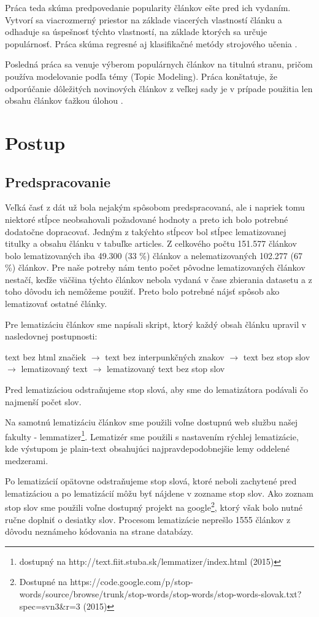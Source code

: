 \documentclass[runningheads,a4paper]{llncs}
\begin{document}
Práca teda skúma predpovedanie popularity článkov ešte pred ich vydaním. Vytvorí sa viacrozmerný priestor na základe viacerých vlastností článku a odhaduje sa úspešnosť týchto vlastností, na základe ktorých sa určuje populárnosť. Práca skúma regresné aj klasifikačné metódy strojového učenia \cite{pulse}.

Posledná práca sa venuje výberom populárnych článkov na titulnú stranu, pričom používa modelovanie podľa témy (Topic Modeling). Práca konštatuje, že odporúčanie dôležitých novinových článkov z veľkej sady je v prípade použitia len obsahu článkov ťažkou úlohou \cite{topic}.

\section{Postup}
\subsection{Predspracovanie}
Veľká časť z dát už bola nejakým spôsobom predspracovaná, ale i napriek tomu niektoré stĺpce neobsahovali požadované hodnoty a preto ich bolo potrebné dodatočne dopracovať. Jedným z takýchto stĺpcov bol stĺpec lematizovanej titulky a obsahu článku v tabuľke articles. Z celkového počtu 151.577 článkov bolo lematizovaných iba 49.300 (33 \%) článkov a nelematizovaných 102.277 (67 \%) článkov. Pre naše potreby nám tento počet pôvodne lematizovaných článkov nestačí, keďže väčšina týchto článkov nebola vydaná v čase zbierania datasetu a z toho dôvodu ich nemôžeme použiť. Preto bolo potrebné nájsť spôsob ako lematizovať ostatné články.
 
Pre lematizáciu článkov sme napísali skript, ktorý každý obsah článku upravil v nasledovnej postupnosti:

text bez html značiek $\rightarrow$ text bez interpunkčných znakov $\rightarrow$ text bez stop slov $\rightarrow$ lematizovaný text $\rightarrow$ lematizovaný text bez stop slov

Pred lematizáciou odstraňujeme stop slová, aby sme do lematizátora podávali čo najmenší počet slov.

Na samotnú lematizáciu článkov sme použili voľne dostupnú web službu našej fakulty - lemmatizer\footnote{dostupný na http://text.fiit.stuba.sk/lemmatizer/index.html (2015)}. Lematizér sme použili s nastavením rýchlej lematizácie, kde výstupom je plain-text obsahujúci najpravdepodobnejšie lemy oddelené medzerami.

Po lematizácií opätovne odstraňujeme stop slová, ktoré neboli zachytené pred lematizáciou a po lematizácií môžu byť nájdene v zozname stop slov.
Ako zoznam stop slov sme použili voľne dostupný projekt na google\footnote{Dostupné na https://code.google.com/p/stop-words/source/browse/trunk/stop-words/stop-words/stop-words-slovak.txt?spec=svn3\&r=3 (2015)}, ktorý však bolo nutné ručne doplniť o desiatky slov. Procesom lematizácie neprešlo 1555 článkov z dôvodu neznámeho kódovania na strane databázy.
\end{document}
